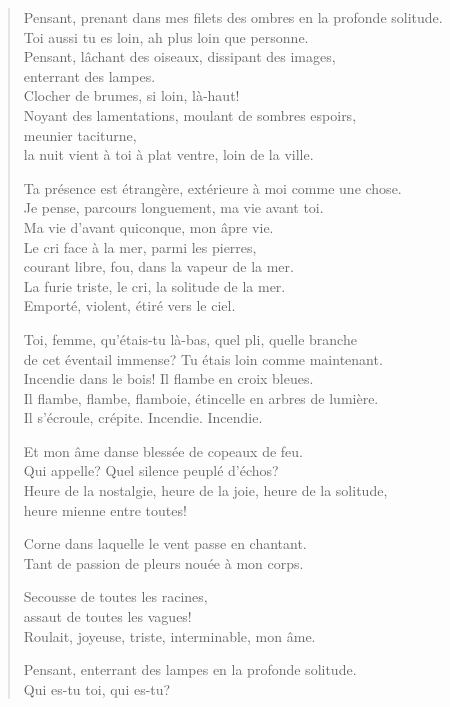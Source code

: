 \documentclass[11pt,a4paper]{book}
\begin{document}
\begin{verse}
  Pensant, prenant dans mes filets des ombres en la profonde solitude. \\
  Toi aussi tu es loin, ah plus loin que personne. \\
  Pensant, lâchant des oiseaux, dissipant des images, \\
  enterrant des lampes. \\
  Clocher de brumes, si loin, là-haut! \\
  Noyant des lamentations, moulant de sombres espoirs, \\
  meunier taciturne, \\
  la nuit vient à toi à plat ventre, loin de la ville.

  Ta présence est étrangère, extérieure à moi comme une chose. \\
  Je pense, parcours longuement, ma vie avant toi. \\
  Ma vie d'avant quiconque, mon âpre vie. \\
  Le cri face à la mer, parmi les pierres, \\
  courant libre, fou, dans la vapeur de la mer. \\
  La furie triste, le cri, la solitude de la mer. \\
  Emporté, violent, étiré vers le ciel.

  Toi, femme, qu'étais-tu là-bas, quel pli, quelle branche \\
  de cet éventail immense? Tu étais loin comme maintenant. \\
  Incendie dans le bois! Il flambe en croix bleues. \\
  Il flambe, flambe, flamboie, étincelle en arbres de lumière. \\
  Il s'écroule, crépite. Incendie. Incendie.

  Et mon âme danse blessée de copeaux de feu. \\
  Qui appelle? Quel silence peuplé d'échos? \\
  Heure de la nostalgie, heure de la joie, heure de la solitude, \\
  heure mienne entre toutes!

  Corne dans laquelle le vent passe en chantant. \\
  Tant de passion de pleurs nouée à mon corps.

  Secousse de toutes les racines, \\
  assaut de toutes les vagues! \\
  Roulait, joyeuse, triste, interminable, mon âme.

  Pensant, enterrant des lampes en la profonde solitude. \\
  Qui es-tu toi, qui es-tu?
\end{verse}
\end{document}
